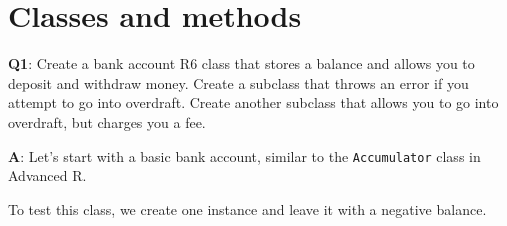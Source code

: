 \documentclass[
]{krantz}
\makeatletter
\newenvironment{Shaded}{\begin{snugshade}}{\end{snugshade}}
\newcommand{\CommentTok}[1]{\textcolor[rgb]{0.56,0.35,0.01}{\textit{#1}}}
\newcommand{\ControlFlowTok}[1]{\textcolor[rgb]{0.13,0.29,0.53}{\textbf{#1}}}
\newcommand{\DataTypeTok}[1]{\textcolor[rgb]{0.13,0.29,0.53}{#1}}
\newcommand{\DecValTok}[1]{\textcolor[rgb]{0.00,0.00,0.81}{#1}}
\newcommand{\KeywordTok}[1]{\textcolor[rgb]{0.13,0.29,0.53}{\textbf{#1}}}
\newcommand{\NormalTok}[1]{#1}
\newcommand{\OperatorTok}[1]{\textcolor[rgb]{0.81,0.36,0.00}{\textbf{#1}}}
\newcommand{\StringTok}[1]{\textcolor[rgb]{0.31,0.60,0.02}{#1}}
\newenvironment{kframe}{%
\medskip{}
\setlength{\fboxsep}{.8em}
 \def\at@end@of@kframe{}%
 \ifinner\ifhmode%
  \def\at@end@of@kframe{\end{minipage}}%
  \begin{minipage}{\columnwidth}%
 \fi\fi%
 \def\FrameCommand##1{\hskip\@totalleftmargin \hskip-\fboxsep
 \colorbox{shadecolor}{##1}\hskip-\fboxsep
     \hskip-\linewidth \hskip-\@totalleftmargin \hskip\columnwidth}%
 \MakeFramed {\advance\hsize-\width
   \@totalleftmargin\z@ \linewidth\hsize
   \@setminipage}}%
 {\par\unskip\endMakeFramed%
 \at@end@of@kframe}
\renewenvironment{Shaded}{\begin{kframe}}{\end{kframe}}
\renewcommand{\KeywordTok} [1]{\textcolor[rgb]{0.00,0.44,0.13}{{#1}}}
\renewcommand{\DataTypeTok}[1]{\textcolor[rgb]{0.56,0.13,0.00}{{#1}}}
\renewcommand{\DecValTok}  [1]{\textcolor[rgb]{0.25,0.63,0.44}{{#1}}}
\renewcommand{\StringTok}  [1]{\textcolor[rgb]{0.25,0.44,0.63}{{#1}}}
\renewcommand{\CommentTok} [1]{\textcolor[rgb]{0.38,0.63,0.69}{{#1}}}
\renewcommand{\NormalTok}  [1]{{#1}}
\makeatother
\begin{document}

\hypertarget{classes-and-methods}{%
\section{Classes and methods}\label{classes-and-methods}}

\textbf{{Q1}}: Create a bank account R6 class that stores a balance and allows you to deposit and withdraw money. Create a subclass that throws an error if you attempt to go into overdraft. Create another subclass that allows you to go into overdraft, but charges you a fee.

\textbf{{A}}: Let's start with a basic bank account, similar to the \texttt{Accumulator} class in Advanced R.

\begin{Shaded}
\end{Shaded}

To test this class, we create one instance and leave it with a negative balance.

\begin{Shaded}
\end{Shaded}
\end{document}
